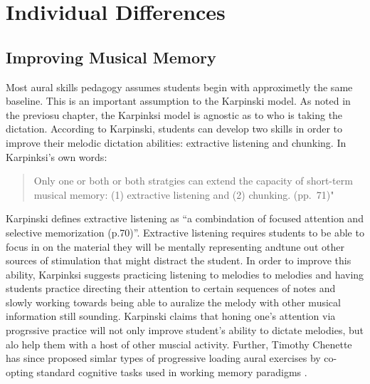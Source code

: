 \documentclass[]{book}
\begin{document}
\hypertarget{individual-differences-1}{%
\section{Individual Differences}\label{individual-differences-1}}

\hypertarget{improving-musical-memory}{%
\subsection{Improving Musical Memory}\label{improving-musical-memory}}

Most aural skills pedagogy assumes students begin with approximetly the same baseline.
This is an important assumption to the Karpinski model.
As noted in the previosu chapter, the Karpinksi model is agnostic as to who is taking the dictation.
According to Karpinski, students can develop two skills in order to improve their melodic dictation abilities: extractive listening and chunking.
In Karpinksi's own words:

\begin{quote}
Only one or both or both stratgies can extend the capacity of short-term musical memory: (1) extractive listening and (2) chunking. (pp.~71)"
\end{quote}

Karpinski defines extractive listening as ``a combindation of focused attention and selective memorization (p.70)''.
Extractive listening requires students to be able to focus in on the material they will be mentally representing andtune out other sources of stimulation that might distract the student.
In order to improve this ability, Karpinksi suggests practicing listening to melodies to melodies and having students practice directing their attention to certain sequences of notes and slowly working towards being able to auralize the melody with other musical information still sounding.
Karpinski claims that honing one's attention via progrssive practice will not only improve student's ability to dictate melodies, but alo help them with a host of other muscial activity.
Further, Timothy Chenette has since proposed simlar types of progressive loading aural exercises by co-opting standard cognitive tasks used in working memory paradigms \citep{chenetteReframingAuralSkills2019} .
\end{document}
